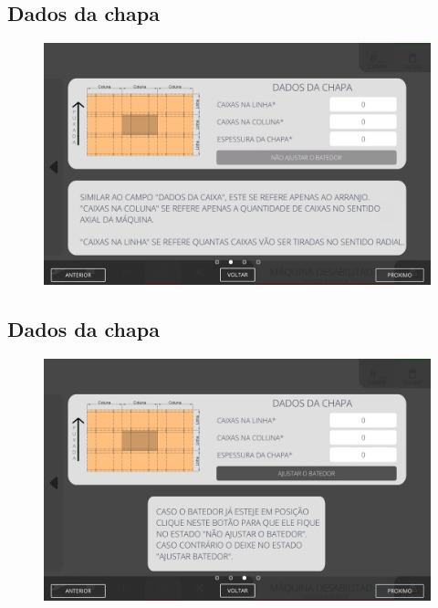 \thispagestyle{fancy}
\vspace{\fill}
\subsection{\small Dados da chapa}
\begin{figure}
    \centering
    \includegraphics[width=576 px,height=360 px]{src/imagesICV/09-request/new/e-7.png}
\end{figure}
\newpage

\thispagestyle{fancy}
\vspace{\fill}
\subsection{\small Dados da chapa}
\begin{figure}
    \centering
    \includegraphics[width=576 px,height=360 px]{src/imagesICV/09-request/new/e-8-COM-ERRO-DIGITAÇÃO.png}
\end{figure}
\newpage

